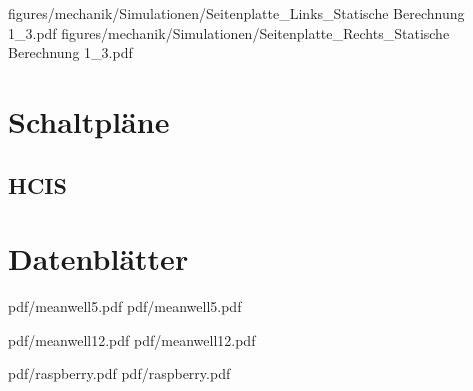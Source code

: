 
 {figures/mechanik/Simulationen/Seitenplatte_Links_Statische Berechnung 1_3.pdf}
 {figures/mechanik/Simulationen/Seitenplatte_Rechts_Statische Berechnung 1_3.pdf}

\chapter{Schaltpläne}

\newpage

\section{HCIS}

\chapter{Datenblätter}

 {pdf/meanwell5.pdf}
 {pdf/meanwell5.pdf}


 {pdf/meanwell12.pdf}
 {pdf/meanwell12.pdf}

 {pdf/raspberry.pdf}
 {pdf/raspberry.pdf}


